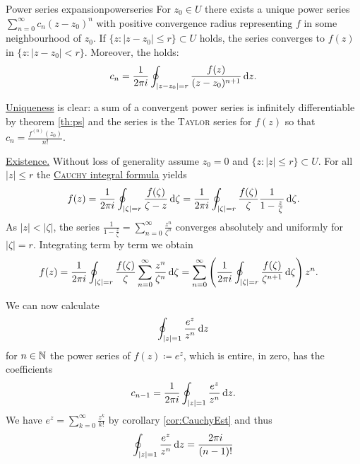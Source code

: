 \documentclass[a4paper,english]{article}
\begin{document}
\begin{thm}{Power series expansion}{powerseries}
    For $z_0 \in U$ there exists a unique power series $\sum_{n = 0}^{\infty} c_n ( z - z_0 )^n$ with positive convergence radius representing $f$ in some neighbourhood of $z_0$.
    If $\{ z: | z - z_0 | \le r\} \subset U$ holds, the series converges to $f(z)$ in $\{ z: | z - z_0 | < r\}$.
    Moreover, the  holds:
    \begin{equation*}
        c_n
        = \frac{1}{2 \pi i} \oint_{| z - z_0 | = r} \frac{f(z)}{(z - z_0)^{n + 1}} \mathop{}\!\mathrm{d}{z}.
    \end{equation*}
\end{thm}

\begin{pr}
    \underline{Uniqueness} is clear: a sum of a convergent power series is infinitely differentiable by theorem \ref{th:ps} and the series is the \textsc{Taylor} series for $f(z)$ so that $c_n = \frac{f^{(n)}(z_0)}{n!}$.
    
    \underline{Existence.}
    Without loss of generality assume $z_0 = 0$ and $\{ z: | z | \le r \} \subset U$.
    For all $| z | \le r$ the \hyperref[th:formula]{\textsc{Cauchy} integral formula} yields
    \begin{equation*}
        f(z)
        = \frac{1}{2 \pi i} \oint_{| \zeta | = r} \frac{f(\zeta)}{\zeta - z} \mathop{}\!\mathrm{d}{\zeta}
        = \frac{1}{2 \pi i} \oint_{| \zeta | = r} \frac{f(\zeta)}{\zeta} \frac{1}{1 - \frac{z}{\zeta}} \mathop{}\!\mathrm{d}{\zeta}.
    \end{equation*}
    As $| z | < | \zeta |$, the series $\frac{1}{1 - \frac{z}{\zeta}} = \sum_{n = 0}^{\infty} \frac{z^n}{\zeta^n}$ converges absolutely and uniformly for $| \zeta | = r$.
    Integrating term by term we obtain
    \begin{align*}
        f(z)
        & = \frac{1}{2 \pi i} \oint_{| \zeta | = r} \frac{f(\zeta)}{\zeta} \sum_{n = 0}^{\infty} \frac{z^n}{\zeta^n} \mathop{}\!\mathrm{d}{\zeta}
        = \sum_{n = 0}^{\infty} \left(\frac{1}{2 \pi i} \oint_{| \zeta | = r} \frac{f(\zeta)}{\zeta^{n + 1}} \mathop{}\!\mathrm{d}{\zeta}\right) z^n.
    \end{align*}
\end{pr}

\begin{example}
    We can now calculate
    \begin{equation*}
        \oint_{| z | = 1} \frac{e^z}{z^n} \mathop{}\!\mathrm{d}{z}
    \end{equation*}
    for $n \in \operatorname{\mathbb{N}}$ the power series of $f(z) \coloneqq e^z$, which is entire, in zero, has the coefficients
    \begin{equation*}
        c_{n - 1}
        = \frac{1}{2 \pi i} \oint_{| z | = 1} \frac{e^z}{z^{n}} \mathop{}\!\mathrm{d}{z}.
    \end{equation*}
    We have $e^z = \sum_{k = 0}^{\infty} \frac{z^k}{k!}$ by corollary \ref{cor:CauchyEst} and thus
    \begin{equation*}
        \oint_{| z | = 1} \frac{e^z}{z^n} \mathop{}\!\mathrm{d}{z}
        = \frac{2 \pi i}{(n - 1)!}
    \end{equation*}
\end{example}
\end{document}
